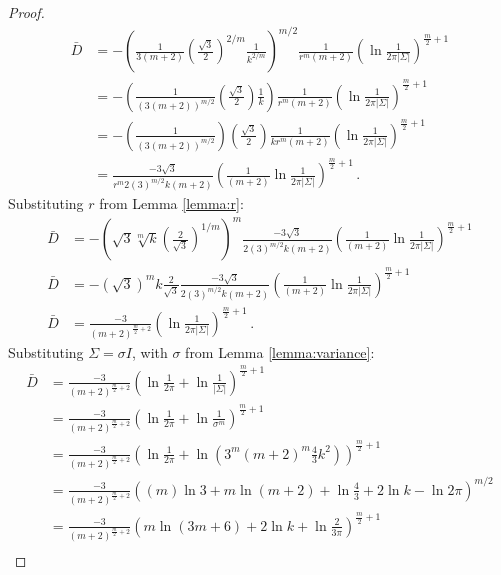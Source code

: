 \documentclass[a4paper,fleqn]{cas-sc}
\theoremstyle{remark}
\begin{document}
\begin{proof}
\begin{align*}
      \bar{D} &= -\left(\frac{1}{3(m+2)}\left(\frac{\sqrt{3}}{2}\right)^{2/m}\frac{1}{k^{2/m}}\right)^{m/2} \frac1{r^m(m+2)} \left(\ln{\frac{1}{2\pi |\Sigma|}} \right)^{\frac{m}{2}+1} \\
            &= -\left(\frac{1}{(3(m+2))^{m/2}}\left(\frac{\sqrt{3}}{2}\right)\frac{1}{k}\right) \frac{1}{r^m(m+2)} \left(\ln{\frac{1}{2\pi |\Sigma|}} \right)^{\frac{m}{2}+1} \\
            &= -\left(\frac{1}{(3(m+2))^{m/2}}\right) \left(\frac{\sqrt{3}}{2}\right) \frac{1}{kr^m(m+2)} \left(\ln{\frac{1}{2\pi |\Sigma|}} \right)^{\frac{m}{2}+1} \\
            &=  \frac{-3 \sqrt{3}}{r^m2(3)^{m/2}k(m+2)} \left(\frac{1}{(m+2)}\ln{\frac{1}{2\pi |\Sigma|}} \right)^{\frac{m}{2}+1} \,.
\end{align*}
Substituting $r$ from Lemma \ref{lemma:r}:
\begin{align*}
       \bar{D} &= -\left(\sqrt{3}\sqrt[m]{k}\left(\frac{2}{\sqrt{3}}\right)^{1/m} \right)^m\frac{-3 \sqrt{3}}{2(3)^{m/2}k(m+2)} \left(\frac{1}{(m+2)}\ln{\frac{1}{2\pi |\Sigma|}} \right)^{\frac{m}{2}+1} \\
       \bar{D} &= -(\sqrt{3})^m k\frac{2}{\sqrt{3}} \frac{-3 \sqrt{3}}{2(3)^{m/2}k(m+2)} \left(\frac{1}{(m+2)}\ln{\frac{1}{2\pi |\Sigma|}} \right)^{\frac{m}{2}+1} \\
       \bar{D} &= \frac{-3}{(m+2)^{\frac{m}{2}+2}} \left(\ln{\frac{1}{2\pi |\Sigma|}} \right)^{\frac{m}{2}+1} \,.
\end{align*}
Substituting $\Sigma=\sigma I$, with $\sigma$ from Lemma \ref{lemma:variance}:
\begin{align*}
       \bar{D} &= \frac{-3}{(m+2)^{\frac{m}{2}+2}} \left(\ln{\frac{1}{2\pi}} + \ln{\frac{1}{|\Sigma|}} \right)^{\frac{m}{2}+1} \\
            &= \frac{-3}{(m+2)^{\frac{m}{2}+2}} \left(\ln{\frac{1}{2\pi}} + \ln{\frac{1}{\sigma^m}} \right)^{\frac{m}{2}+1} \\
            &= \frac{-3}{(m+2)^{\frac{m}{2}+2}} \left(\ln{\frac{1}{2\pi}} + \ln{\left(3^m(m+2)^m\frac{4}{3}k^2\right)} \right)^{\frac{m}{2}+1} \\
            &= \frac{-3}{(m+2)^{\frac{m}{2}+2}} \left((m)\ln{3} +m\ln{(m+2)} + \ln{\tfrac{4}{3}} + 2 \ln{k} - \ln{2\pi} \right)^{m/2} \\
            &= \frac{-3}{(m+2)^{\frac{m}{2}+2}} \left(m\ln{(3m+6)} + 2 \ln{k} + \ln{\tfrac{2}{3\pi}} \right)^{\frac{m}{2}+1} \\

\end{align*}
\end{proof}
\end{document}
